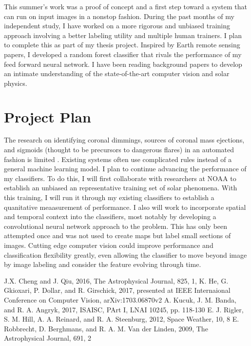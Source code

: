 \documentclass[11pt]{article}
\begin{document}
This summer's work was a proof of concept and a first step toward a system that can run on input images in a nonstop fashion. During the past months of my independent study, I have worked on a more rigorous and unbiased training approach involving a better labeling utility and multiple human trainers. I plan to complete this as part of my thesis project. Inspired by Earth remote sensing papers, I developed a random forest classifier that rivals the performance of my feed forward neural network. I have been reading background papers to develop an intimate understanding of the state-of-the-art computer vision and solar physics. 

\section{Project Plan}
The research on identifying coronal dimmings, sources of coronal mass ejections, and sigmoids (thought to be precursors to dangerous flares) in an automated fashion is limited \cite{cheng2016, robbrecht2009}. Existing systems often use complicated rules instead of a general machine learning model. I plan to continue advancing the performance of my classifiers. To do this, I will first collaborate with researchers at NOAA to establish an unbiased an representative training set of solar phenomena. With this training, I will run it through my existing classifiers to establish a quanitative meaasurement of performance. I also will work to incorporate spatial and temporal context into the classifiers, most notably by developing a convolutional neural network approach to the problem. This has only been attempted once \cite{kucuk2017} and was not used to create maps but label small sections of images. Cutting edge computer vision \cite{he2017} could improve performance and classification flexibility greatly, even allowing the classifier to move beyond image by image labeling and consider the feature evolving through time. 

{\footnotesize

\begin{thebibliography}{}
 J.X. Cheng and J. Qiu, 2016, The Astrophysical Journal, 825, 1,
 K. He, G. Gkioxari, P. Dollar, and R. Girschick,  2017, presented at IEEE Internaional Conference on Computer Vision, arXiv:1703.06870v2
 A. Kucuk, J. M. Banda, and R. A. Angryk, 2017, ISAISC, PArt I, LNAI 10245, pp. 118-130
 E. J. Rigler, S. M. Hill, A. A. Reinard, and R. A. Steenburg, 2012, Space Weather, 10, 8
 E. Robbrecht, D. Berghmans, and R. A. M. Van der Linden, 2009, The Astrophysical Journal, 691, 2
\end{thebibliography}
}
\end{document}
